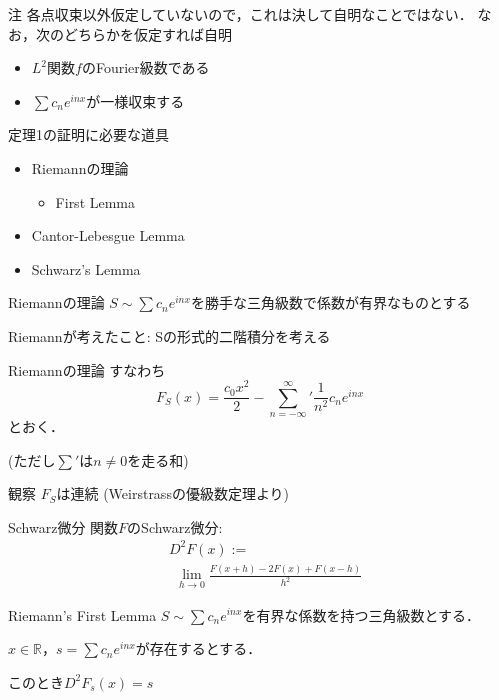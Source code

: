 \documentclass[dvipdfmx,17pt]{beamer}
\theoremstyle{plain}
\newcommand{\R}{\mathbb{R}}
\begin{document}
\begin{frame}{注}
各点収束以外仮定していないので，これは決して自明なことではない．
なお，次のどちらかを仮定すれば自明
\begin{itemize}
	\item $L^2$関数$f$のFourier級数である
	\item $\sum c_n e^{inx}$が一様収束する
\end{itemize}
\end{frame}

\begin{frame}{定理1の証明に必要な道具}
\begin{itemize}
	\item Riemannの理論
	\begin{itemize}
		\item First Lemma
	\end{itemize}
	\item Cantor-Lebesgue Lemma
	\item Schwarz's Lemma
\end{itemize}
\end{frame}

\begin{frame}{Riemannの理論}
$S \sim \sum c_n e^{inx}$を勝手な三角級数で係数が有界なものとする

Riemannが考えたこと: Sの形式的二階積分を考える
\end{frame}

\begin{frame}{Riemannの理論}
すなわち
\[F_S(x) = \frac{c_0 x^2}{2} - {\sum_{n=-\infty}^{\infty}}' \frac{1}{n^2} c_n e^{inx} \]
とおく．

(ただし$\sum'$は$n \neq 0$を走る和)
\end{frame}

\begin{frame}{観察}
$F_S$は連続 (Weirstrassの優級数定理より)
\end{frame}

\begin{frame}{Schwarz微分}
関数$F$のSchwarz微分:
\begin{align*}
& D^2F(x) := \\
& \ \ \lim_{h\to0} \frac{F(x+h) - 2F(x) + F(x-h)}{h^2}
\end{align*}
\end{frame}

\begin{frame}{Riemann's First Lemma}
$S \sim \sum c_n e^{inx}$を有界な係数を持つ三角級数とする．

$x \in \R$，$s = \sum c_n e^{inx}$が存在するとする．

このとき$D^2F_s(x) = s$
\end{frame}
\end{document}
